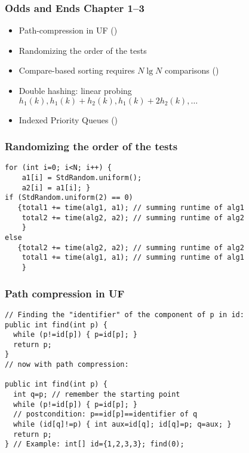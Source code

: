 \documentclass[handout]{beamer}
\begin{document}
\begin{frame}[fragile]
    \frametitle{Odds and Ends Chapter 1--3}

\begin{itemize}[<+->]
\item Path-compression in UF
(\hyperlink{pathcompression}{\color{red}{\ref{pathcompression}}})
\item Randomizing the order of the tests
\item Compare-based sorting requires $N \lg N$ comparisons
(\hyperlink{comparebasedsorting}{\color{red}{\ref{comparebasedsorting}}})
\item Double hashing: linear probing $h_1(k), h_1(k)+h_2(k), h_1(k)+2h_2(k), \ldots$
\item Indexed Priority Queues
(\hyperlink{indexedprioqueues}{\color{red}{\ref{indexedprioqueues}}})
\end{itemize}
\end{frame}

\begin{frame}[fragile]
    \frametitle{Randomizing the order of the tests}
\begin{verbatim}
for (int i=0; i<N; i++) {
    a1[i] = StdRandom.uniform();
    a2[i] = a1[i]; }
if (StdRandom.uniform(2) == 0)
   {total1 += time(alg1, a1); // summing runtime of alg1
    total2 += time(alg2, a2); // summing runtime of alg2
    }
else 
   {total2 += time(alg2, a2); // summing runtime of alg2
    total1 += time(alg1, a1); // summing runtime of alg1
    }
\end{verbatim}
\end{frame}

\begin{frame}[fragile]
    \frametitle{Path compression in UF}\label{pathcompression}
\begin{verbatim}
// Finding the "identifier" of the component of p in id:
public int find(int p) {
  while (p!=id[p]) { p=id[p]; }
  return p;
}  
// now with path compression:

public int find(int p) {
  int q=p; // remember the starting point
  while (p!=id[p]) { p=id[p]; }
  // postcondition: p==id[p]==identifier of q
  while (id[q]!=p) { int aux=id[q]; id[q]=p; q=aux; }
  return p;
} // Example: int[] id={1,2,3,3}; find(0);
\end{verbatim}
\end{frame}
\end{document}
